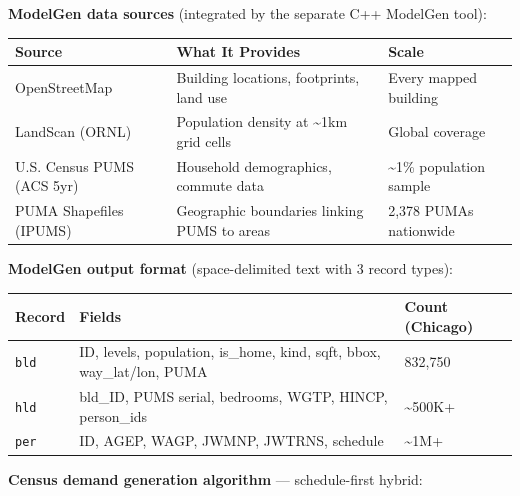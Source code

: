 \textbf{ModelGen data sources} (integrated by the separate C++ ModelGen
tool):

\begin{longtable}[]{@{}lll@{}}
\toprule\noalign{}
Source & What It Provides & Scale \\
\midrule\noalign{}
\endhead
\bottomrule\noalign{}
\endlastfoot
OpenStreetMap & Building locations, footprints, land use & Every mapped
building \\
LandScan (ORNL) & Population density at \textasciitilde1km grid cells &
Global coverage \\
U.S. Census PUMS (ACS 5yr) & Household demographics, commute data &
\textasciitilde1\% population sample \\
PUMA Shapefiles (IPUMS) & Geographic boundaries linking PUMS to areas &
2,378 PUMAs nationwide \\
\end{longtable}

\textbf{ModelGen output format} (space-delimited text with 3 record
types):

\begin{longtable}[]{@{}lll@{}}
\toprule\noalign{}
Record & Fields & Count (Chicago) \\
\midrule\noalign{}
\endhead
\bottomrule\noalign{}
\endlastfoot
\texttt{bld} & ID, levels, population, is\_home, kind, sqft, bbox,
way\_lat/lon, PUMA & 832,750 \\
\texttt{hld} & bld\_ID, PUMS serial, bedrooms, WGTP, HINCP, person\_ids
& \textasciitilde500K+ \\
\texttt{per} & ID, AGEP, WAGP, JWMNP, JWTRNS, schedule &
\textasciitilde1M+ \\
\end{longtable}

\textbf{Census demand generation algorithm} --- schedule-first hybrid:


